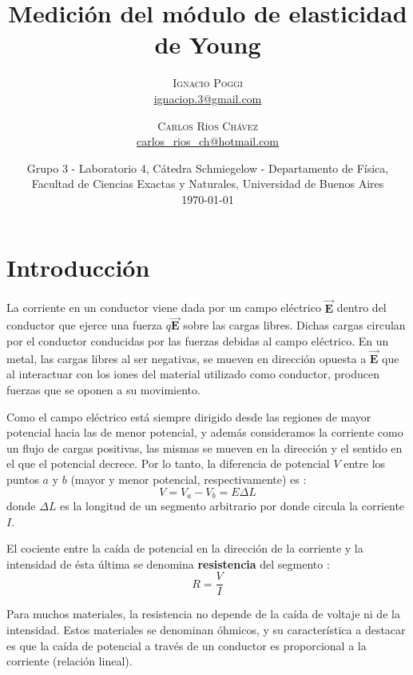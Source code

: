 \documentclass[twoside,twocolumn,a4paper]{article}
\title{Medici\'on del m\'odulo de elasticidad de Young} %
\author{%
\textsc{Ignacio Poggi} \\[1ex] %
\normalsize \href{mailto:ignaciop.3@gmail.com}{ignaciop.3@gmail.com} %
\and %
\textsc{Carlos R\'ios Ch\'avez} \\[1ex] %
\normalsize \href{mailto:carlos_rios_ch@hotmail.com}{carlos\_rios\_ch@hotmail.com} %
}
\date{Grupo 3 - Laboratorio 4, C\'atedra Schmiegelow - Departamento de F\'isica, Facultad de Ciencias Exactas y Naturales, Universidad de Buenos Aires \newline \\ \today} %
\begin{document}
\maketitle



\section{Introducci\'on}

La corriente en un conductor viene dada por un campo el\'ectrico $\mathbf{\vec{E}}$ dentro del conductor que ejerce una fuerza $q\mathbf{\vec{E}}$ sobre las cargas libres. Dichas cargas circulan por el conductor conducidas por las fuerzas debidas al campo el\'ectrico. En un metal, las cargas libres al ser negativas, se mueven en direcci\'on opuesta a $\mathbf{\vec{E}}$ que al interactuar con los iones del material utilizado como conductor, producen fuerzas que se oponen a su movimiento.\par
Como el campo el\'ectrico est\'a siempre dirigido desde las regiones de mayor potencial hacia las de menor potencial, y adem\'as consideramos la corriente como un flujo de cargas positivas, las mismas se mueven en la direcci\'on y el sentido en el que el potencial decrece. Por lo tanto, la diferencia de potencial $V$ entre los puntos $a$ y $b$ (mayor y menor potencial, respectivamente) es \cite{eq:potencial}:
\begin{equation}
\label{eq:potencial}
V = V_{a} - V_{b} = E\Delta L
\end{equation}
donde $\Delta L$ es la longitud de un segmento arbitrario por donde circula la corriente $I$.
\par El cociente entre la ca\'ida de potencial en la direcci\'on de la corriente y la intensidad de \'esta \'ultima se denomina \textbf{resistencia} del segmento \cite{eq:ohm1}:
\begin{equation}
\label{eq:ohm1}
R = \frac{V}{I}
\end{equation}
\par Para muchos materiales, la resistencia no depende de la ca\'ida de voltaje ni de la intensidad. Estos materiales se denominan \'ohmicos, y su caracter\'istica a destacar es que la ca\'ida de potencial a trav\'es de un conductor es proporcional a la corriente (relaci\'on lineal).
\end{document}
